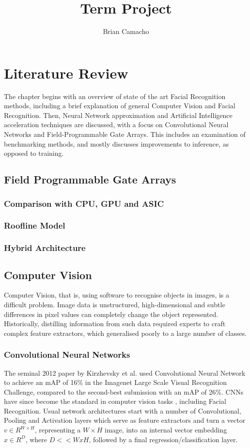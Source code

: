\documentclass[12pt]{article}
\title{Term Project}
\author{Brian Camacho}
\begin{document}
\maketitle

\newpage
{}

\section{Literature Review}
The chapter begins with an overview of state of the art Facial Recognition methods, including
a brief explanation of general Computer Vision and Facial Recognition.
Then, Neural Network approximation and Artificial Intelligence acceleration techniques are
discussed, with a focus on Convolutional Neural Networks and Field-Programmable Gate Arrays. This
includes an  examination of benchmarking methods, and mostly discusses improvements to inference,
as opposed to training.
\subsection{Field Programmable Gate Arrays}
\subsubsection{Comparison with CPU, GPU and ASIC}

\subsubsection{Roofline Model}
\subsubsection{Hybrid Architecture}

\subsection{Computer Vision}
Computer Vision, that is, using software to recognise objects in images, is a difficult
problem. Image data is unstructured, high-dimensional and subtle differences in pixel values
can completely change the object represented\cite{prince2012computer}.
Historically, distilling information from such data required experts to craft complex feature
extractors, which generalised poorly to a large number of classes.

\subsubsection{Convolutional Neural Networks}
The seminal 2012 paper by Kirzhevsky et al. used Convolutional Neural Network to achieve an mAP
of 16\% in the Imagenet Large Scale Visual Recognition Challenge, compared to the second-best
submission with an mAP of 26\%\cite{ILSVRC15}.
CNNs have since become the standard in computer vision tasks \cite{sze2017efficient}, including
Facial Recognition.
Usual network architectures start with a number of Convolutional, Pooling and Activation layers
which serve as feature extractors and turn a vector $v \in R^{W\times H}$, representing a
$W\times H$ image, into an internal vector embedding $x \in R^D$, where $D << WxH$, followed
by a final regression/classification layer.
\end{document}
